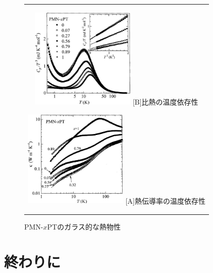 \documentclass[10pt,b5paper,papersize,dvipdfmx]{jsbook}
\begin{document}
\begin{figure}[htbp]
  \begin{center}
      \begin{tabular}{c}  
      \begin{minipage}{0.5\hsize}
          \begin{center}
            \includegraphics[clip, width=5cm]{img/relaxor-heat-capacity.pdf}
            \hspace{1.6cm} [B]比熱の温度依存性
          \end{center}
        \end{minipage}
        \begin{minipage}{0.5\hsize}
          \begin{center}
            \includegraphics[clip, width=5cm]{img/relaxor-thermal-conductivity.pdf}
            \hspace{1.6cm} [A]熱伝導率の温度依存性
      \end{center}
      \end{minipage}
      \end{tabular}
      \caption{PMN-$x$PTのガラス的な熱物性\cite{relaxCT}}
      \label{fig:lena}
  \end{center}
\end{figure}


\section{終わりに}

\end{document}
